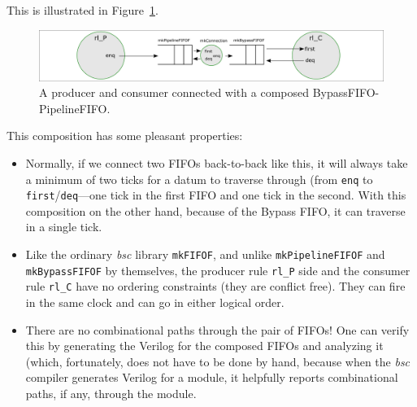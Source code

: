 This is illustrated in Figure~\ref{Fig_Composed_FIFO_Producer_Consumer}.
\begin{figure}[htbp]
  \centerline{\includegraphics[width=6in,angle=0]{Figures/Fig_Composed_FIFO_Producer_Consumer}}
  \caption{\label{Fig_Composed_FIFO_Producer_Consumer}
                  A producer and consumer connected with a composed BypassFIFO-PipelineFIFO.}
\end{figure}
This composition has some pleasant properties:

\begin{itemize}

 \item Normally, if we connect two FIFOs back-to-back like this, it
       will always take a minimum of two ticks for a datum to traverse
       through (from \verb|enq| to \verb|first|/\verb|deq|---one tick
       in the first FIFO and one tick in the second.  With this
       composition on the other hand, because of the Bypass FIFO, it
       can traverse in a single tick.

 \item Like the ordinary \emph{bsc} library \verb|mkFIFOF|, and unlike
       \verb|mkPipelineFIFOF| and \verb|mkBypassFIFOF| by themselves,
       the producer rule \verb|rl_P| side and the consumer rule
       \verb|rl_C| have no ordering constraints (they are conflict
       free).  They can fire in the same clock and can go in either
       logical order.

 \item There are no combinational paths through the pair of FIFOs!
       One can verify this by generating the Verilog for the composed
       FIFOs and analyzing it (which, fortunately, does not have to be
       done by hand, because when the \emph{bsc} compiler generates
       Verilog for a module, it helpfully reports combinational paths,
       if any, through the module.

\end{itemize}


